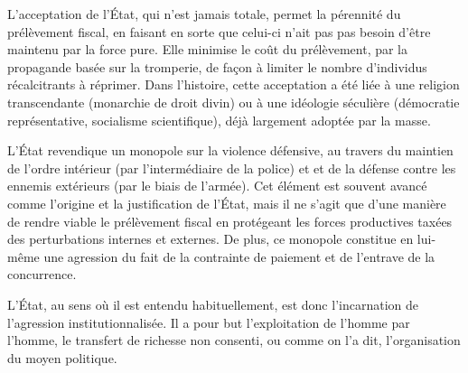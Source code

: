 L'acceptation de l'État, qui n'est jamais totale, permet la pérennité du prélèvement fiscal, en faisant en sorte que celui-ci n'ait pas pas besoin d'être maintenu par la force pure. Elle minimise le coût du prélèvement, par la propagande basée sur la tromperie, de façon à limiter le nombre d'individus récalcitrants à réprimer. Dans l'histoire, cette acceptation a été liée à une religion transcendante (monarchie de droit divin) ou à une idéologie séculière (démocratie représentative, socialisme scientifique), déjà largement adoptée par la masse. %

L'État revendique un monopole sur la violence défensive, au travers du maintien de l'ordre intérieur (par l'intermédiaire de la police) et et de la défense contre les ennemis extérieurs (par le biais de l'armée). Cet élément est souvent avancé comme l'origine et la justification de l'État, mais il ne s'agit que d'une manière de rendre viable le prélèvement fiscal en protégeant les forces productives taxées des perturbations internes et externes. De plus, ce monopole constitue en lui-même une agression du fait de la contrainte de paiement et de l'entrave de la concurrence.

L'État, au sens où il est entendu habituellement, est donc l'incarnation de l'agression institutionnalisée. Il a pour but l'exploitation de l'homme par l'homme, le transfert de richesse non consenti, ou comme on l'a dit, l'organisation du moyen politique.

